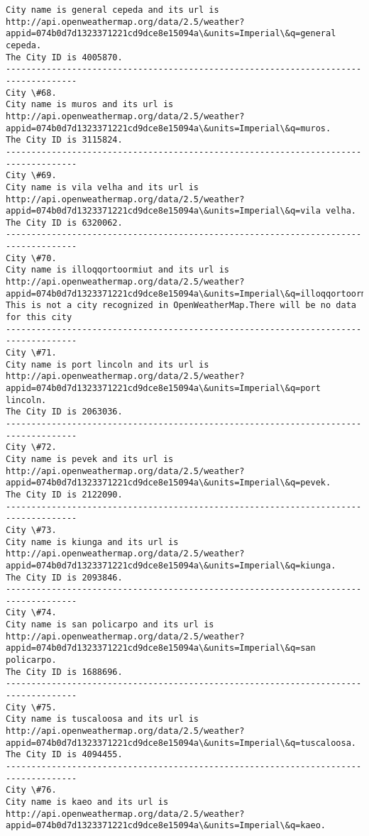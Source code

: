 \documentclass[11pt]{article}
\begin{document}
\begin{Verbatim}[commandchars=\\\{\}]
City name is general cepeda and its url is http://api.openweathermap.org/data/2.5/weather?appid=074b0d7d1323371221cd9dce8e15094a\&units=Imperial\&q=general cepeda.
The City ID is 4005870.
------------------------------------------------------------------------------------
City \#68.
City name is muros and its url is http://api.openweathermap.org/data/2.5/weather?appid=074b0d7d1323371221cd9dce8e15094a\&units=Imperial\&q=muros.
The City ID is 3115824.
------------------------------------------------------------------------------------
City \#69.
City name is vila velha and its url is http://api.openweathermap.org/data/2.5/weather?appid=074b0d7d1323371221cd9dce8e15094a\&units=Imperial\&q=vila velha.
The City ID is 6320062.
------------------------------------------------------------------------------------
City \#70.
City name is illoqqortoormiut and its url is http://api.openweathermap.org/data/2.5/weather?appid=074b0d7d1323371221cd9dce8e15094a\&units=Imperial\&q=illoqqortoormiut.
This is not a city recognized in OpenWeatherMap.There will be no data for this city
------------------------------------------------------------------------------------
City \#71.
City name is port lincoln and its url is http://api.openweathermap.org/data/2.5/weather?appid=074b0d7d1323371221cd9dce8e15094a\&units=Imperial\&q=port lincoln.
The City ID is 2063036.
------------------------------------------------------------------------------------
City \#72.
City name is pevek and its url is http://api.openweathermap.org/data/2.5/weather?appid=074b0d7d1323371221cd9dce8e15094a\&units=Imperial\&q=pevek.
The City ID is 2122090.
------------------------------------------------------------------------------------
City \#73.
City name is kiunga and its url is http://api.openweathermap.org/data/2.5/weather?appid=074b0d7d1323371221cd9dce8e15094a\&units=Imperial\&q=kiunga.
The City ID is 2093846.
------------------------------------------------------------------------------------
City \#74.
City name is san policarpo and its url is http://api.openweathermap.org/data/2.5/weather?appid=074b0d7d1323371221cd9dce8e15094a\&units=Imperial\&q=san policarpo.
The City ID is 1688696.
------------------------------------------------------------------------------------
City \#75.
City name is tuscaloosa and its url is http://api.openweathermap.org/data/2.5/weather?appid=074b0d7d1323371221cd9dce8e15094a\&units=Imperial\&q=tuscaloosa.
The City ID is 4094455.
------------------------------------------------------------------------------------
City \#76.
City name is kaeo and its url is http://api.openweathermap.org/data/2.5/weather?appid=074b0d7d1323371221cd9dce8e15094a\&units=Imperial\&q=kaeo.

\end{Verbatim}
\end{document}
